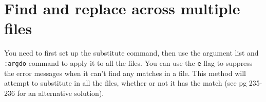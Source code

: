 \section{Find and replace across multiple files}

You need to first set up the substitute command, then use the argument list and \verb|:argdo| command to apply it to all the files.
You can use the \verb|e| flag to suppress the error messages when it can't find any matches in a file.
This method will attempt to substitute in all  the files, whether or not it has the match (see pg 235-236 for an alternative solution).
